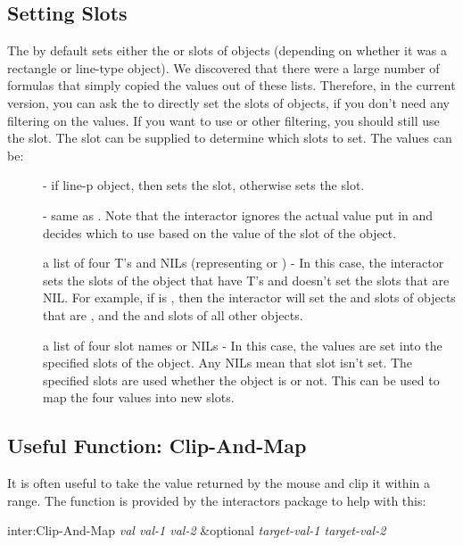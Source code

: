 \subsection{Setting Slots}

The  by default sets either the  or
 slots of objects (depending on whether it was a rectangle
or line-type object).  We discovered that there were a large number of
formulas that simply copied the values out of these lists.  Therefore,
in the current version, you can ask the  to
directly set the slots of objects, if you don't need any filtering
on the values.  If you want to use  or other
filtering, you should still use the  slot.  The slot
 can be supplied to determine which slots to set.
The values can be:
\begin{description}
\item[]  - if line-p object, then sets
the  slot, otherwise sets the  slot.

\item[]  - same as .  Note that the interactor ignores the
actual value put in  and decides which to use based
on the value of the  slot of the object.

\item[] a list of four T's and NILs (representing 
or ) - In this case,
the interactor sets the slots of the
object that have T's and doesn't set the slots that are NIL.  For
example, if  is , then the
interactor will set the  and  slots of objects that
are , and the  and  slots of all other
objects.

\item[] a list of four slot names or NILs - In this case, the values are set
into the specified slots of the object.  Any NILs mean that slot isn't
set.  The specified slots are used whether the object is  or
not.  This can be used to map the four values into new slots.
\end{description}



\subsection{Useful Function: Clip-And-Map}
\label{clipandmap}
It is often useful to take the value returned by the mouse and clip it
within a range.  The function  is provided by the
interactors package to help with this:
\begin{programexample}
inter:Clip-And-Map {\it val  val-1  val-2} \&optional {\it target-val-1  target-val-2}\value{function}
\end{programexample}

